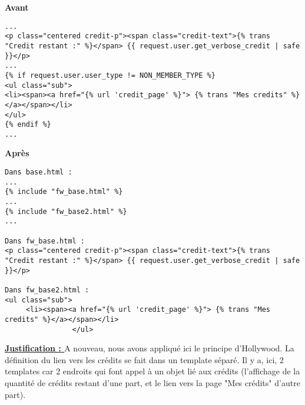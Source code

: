 \begin{minipage}{.5\textwidth}
\begin{center} \textbf{Avant}\end{center}
\begin{lstlisting}
...
<p class="centered credit-p"><span class="credit-text">{% trans "Credit restant :" %}</span> {{ request.user.get_verbose_credit | safe }}</p>
...
{% if request.user.user_type != NON_MEMBER_TYPE %}
<ul class="sub">
<li><span><a href="{% url 'credit_page' %}"> {% trans "Mes credits" %}</a></span></li>
</ul>
{% endif %}
...
\end{lstlisting} 
\end{minipage}
\hspace{0.3cm}
\begin{minipage}{.5\textwidth}
\begin{center} \textbf{Après}\end{center}
\begin{lstlisting}
Dans base.html :
...
{% include "fw_base.html" %}
...
{% include "fw_base2.html" %}
...

Dans fw_base.html : 
<p class="centered credit-p"><span class="credit-text">{% trans "Credit restant :" %}</span> {{ request.user.get_verbose_credit | safe }}</p>

Dans fw_base2.html : 
<ul class="sub">
     <li><span><a href="{% url 'credit_page' %}"> {% trans "Mes credits" %}</a></span></li>
                </ul>

\end{lstlisting} 
\end{minipage}

\textbf{\underline{Justification : }} A nouveau,  nous avons appliqué ici le principe d'Hollywood.  La définition du lien vers les crédits se fait dans un template séparé.  Il y a,  ici,  2 templates car 2 endroits qui font appel à un objet lié aux crédits (l'affichage de la quantité de crédits restant d'une part,  et le lien vers la page "Mes crédits" d'autre part).

